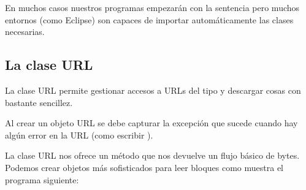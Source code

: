 \documentclass[a4paper,12pt,spanish]{sphinxmanual}
\begin{document}
En muchos casos nuestros programas empezarán con la sentencia  pero muchos entornos (como Eclipse) son capaces de importar automáticamente las clases necesarias.


\subsection{La clase URL}
\label{textos/tema3:la-clase-url}
La clase URL permite gestionar accesos a URLs del tipo  y descargar cosas con bastante sencillez.

Al crear un objeto URL se debe capturar la excepción  que sucede cuando hay algún error en la URL (como escribir ).

La clase URL nos ofrece un método  que nos devuelve un flujo básico de bytes. Podemos crear objetos más sofisticados para leer bloques como muestra el programa siguiente:
\end{document}
